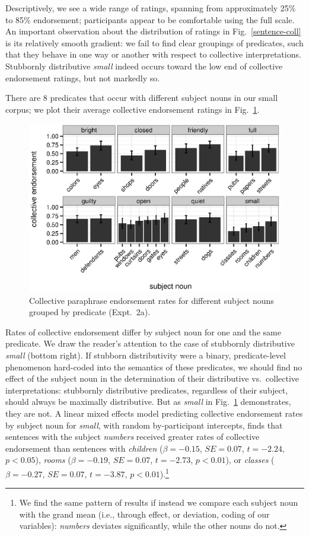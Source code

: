 \documentclass[linguex]{sp}
\begin{document}
Descriptively, we see a wide range of ratings, spanning from approximately 25\%  to 85\% endorsement; participants appear to be comfortable using the full scale. An important observation about the distribution of ratings in Fig.~\ref{sentence-coll} is its relatively smooth gradient: we fail to find clear groupings of predicates, such that they behave in one way or another with respect to collective interpretations. Stubbornly distributive \emph{small} indeed occurs toward the low end of collective endorsement ratings, but not markedly so.

There are 8 predicates that occur with different subject nouns in our small corpus; we plot their average collective endorsement ratings in Fig.~\ref{noun-pred-coll}.
%
\begin{figure}[h!]
	\centering
	\includegraphics[width=.85\linewidth]{plots/noun_pred_plot2.eps}
	\caption{Collective paraphrase endorsement rates for different subject nouns grouped by predicate (Expt.~2a).} \label{noun-pred-coll}
\end{figure}
%
Rates of collective endorsement differ by subject noun for one and the same predicate. We draw the reader's attention to the case of stubbornly distributive \emph{small} (bottom right). 
If stubborn distributivity were a binary, predicate-level phenomenon hard-coded into the semantics of these predicates, we should find no effect of the subject noun in the determination of their distributive vs.~collective interpretations: stubbornly distributive predicates, regardless of their subject, should always be maximally distributive. But as \emph{small} in Fig.~\ref{noun-pred-coll} demonstrates, they are not. 
A linear mixed effects model predicting collective endorsement rates by subject noun for \emph{small}, with random by-participant intercepts, finds that sentences with the subject \emph{numbers} received greater rates of collective endorsement than sentences with \emph{children} ($\beta=-0.15$, $SE=0.07$, $t=-2.24$, $p<0.05$), \emph{rooms} ($\beta=-0.19$, $SE=0.07$, $t=-2.73$, $p<0.01$), or \emph{classes} ($\beta=-0.27$, $SE=0.07$, $t=-3.87$, $p<0.01$).\footnote{We find the same pattern of results if instead we compare each subject noun with the grand mean (i.e., through effect, or deviation, coding of our variables): \emph{numbers} deviates significantly, while the other nouns do not.}
\end{document}
